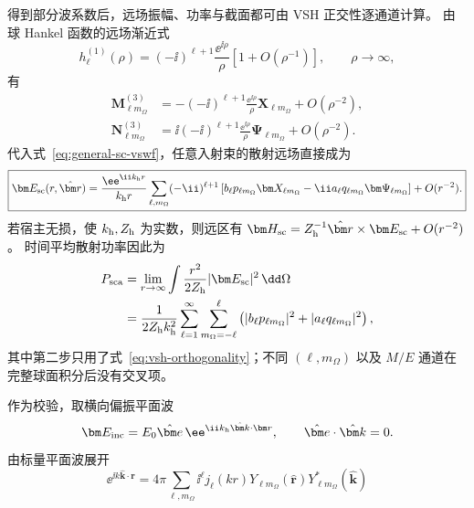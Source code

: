得到部分波系数后，远场振幅、功率与截面都可由 VSH 正交性逐通道计算。
由球 Hankel 函数的远场渐近式
\begin{equation}
h_\ell^{(1)}(\rho)
= (-\ii)^{\ell+1}\frac{\ee^{\ii\rho}}{\rho}
\left[1+O(\rho^{-1})\right],
\qquad \rho\to\infty,
\end{equation}
有
\begin{align}
\bm M_{\ell m_{\Omega}}^{(3)}
&=-(-\ii)^{\ell+1}
\frac{\ee^{\ii\rho}}{\rho}
\bm X_{\ell m_{\Omega}}+O(\rho^{-2}),
\\
\bm N_{\ell m_{\Omega}}^{(3)}
&=\ii(-\ii)^{\ell+1}
\frac{\ee^{\ii\rho}}{\rho}
\bm\Psi_{\ell m_{\Omega}}+O(\rho^{-2}).
\end{align}
代入式~\eqref{eq:general-sc-vswf}，任意入射束的散射远场直接成为
\begin{equation}
\boxed{
\bm E_{\rm sc}(r,\hat{\bm r})
=\frac{\ee^{\ii k_{\rm h}r}}{k_{\rm h}r}
\sum_{\ell,m_{\Omega}}(-\ii)^{\ell+1}
\left[
 b_\ell p_{\ell m_{\Omega}}\bm X_{\ell m_{\Omega}}
-\ii a_\ell q_{\ell m_{\Omega}}\bm\Psi_{\ell m_{\Omega}}
\right]
+O(r^{-2}).}
\label{eq:mie-general-far-field}
\end{equation}
若宿主无损，使 $k_{\rm h},Z_{\rm h}$ 为实数，则远区有
$\bm H_{\rm sc}=Z_{\rm h}^{-1}\hat{\bm r}\times\bm E_{\rm sc}+O(r^{-2})$。
时间平均散射功率因此为
\begin{align}
P_{\rm sca}
&=\lim_{r\to\infty}
\int \frac{r^2}{2Z_{\rm h}}
|\bm E_{\rm sc}|^2\,\dd\Omega
\\
&=\frac{1}{2Z_{\rm h}k_{\rm h}^2}
\sum_{\ell=1}^{\infty}
\sum_{m_{\Omega}=-\ell}^{\ell}
\left(
|b_\ell p_{\ell m_{\Omega}}|^2
+|a_\ell q_{\ell m_{\Omega}}|^2
\right),
\label{eq:mie-arbitrary-beam-scattered-power}
\end{align}
其中第二步只用了式~\eqref{eq:vsh-orthogonality}；不同
$(\ell,m_{\Omega})$ 以及 $M/E$ 通道在完整球面积分后没有交叉项。

作为校验，取横向偏振平面波
\begin{equation}
\bm E_{\rm inc}
=E_0\hat{\bm e}\,
\ee^{\ii k_{\rm h}\hat{\bm k}\cdot\bm r},
\qquad
\hat{\bm e}\cdot\hat{\bm k}=0.
\end{equation}
由标量平面波展开
\begin{equation}
\ee^{\ii k\hat{\bm k}\cdot\bm r}
=4\pi\sum_{\ell,m_{\Omega}}
\ii^\ell j_\ell(kr)
Y_{\ell m_{\Omega}}(\hat{\bm r})
Y_{\ell m_{\Omega}}^*(\hat{\bm k})
\end{equation}



